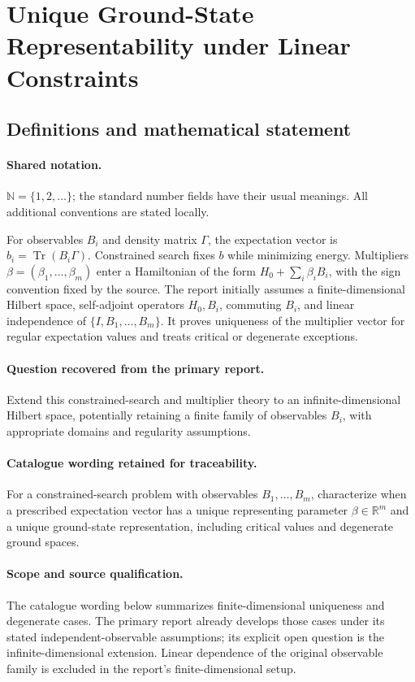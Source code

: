 \documentclass[11pt]{article}
\begin{document}
\section{Unique Ground-State Representability under Linear Constraints}\label{statement}

\subsection{Definitions and mathematical statement}

\paragraph{Shared notation.}$\mathbb N=\{1,2,\ldots\}$; the standard number fields have their usual meanings. All additional conventions are stated locally.


For observables $B_i$ and density matrix $\Gamma$, the expectation vector is $b_i=\operatorname{Tr}(B_i\Gamma)$. Constrained search fixes $b$ while minimizing energy. Multipliers $\beta=(\beta_1,\ldots,\beta_m)$ enter a Hamiltonian of the form $H_0+\sum_i\beta_iB_i$, with the sign convention fixed by the source. The report initially assumes a finite-dimensional Hilbert space, self-adjoint operators $H_0,B_i$, commuting $B_i$, and linear independence of $\{I,B_1,\ldots,B_m\}$. It proves uniqueness of the multiplier vector for regular expectation values and treats critical or degenerate exceptions.

\paragraph{Question recovered from the primary report.}Extend this constrained-search and multiplier theory to an infinite-dimensional Hilbert space, potentially retaining a finite family of observables $B_i$, with appropriate domains and regularity assumptions.

\paragraph{Catalogue wording retained for traceability.}
For a constrained-search problem with observables $B_1,\ldots,B_m$, characterize when a prescribed expectation vector has a unique representing parameter $\beta\in\mathbb{R}^m$ and a unique ground-state representation, including critical values and degenerate ground spaces.

\paragraph{Scope and source qualification.}The catalogue wording below summarizes finite-dimensional uniqueness and degenerate cases. The primary report already develops those cases under its stated independent-observable assumptions; its explicit open question is the infinite-dimensional extension. Linear dependence of the original observable family is excluded in the report's finite-dimensional setup.
\end{document}
